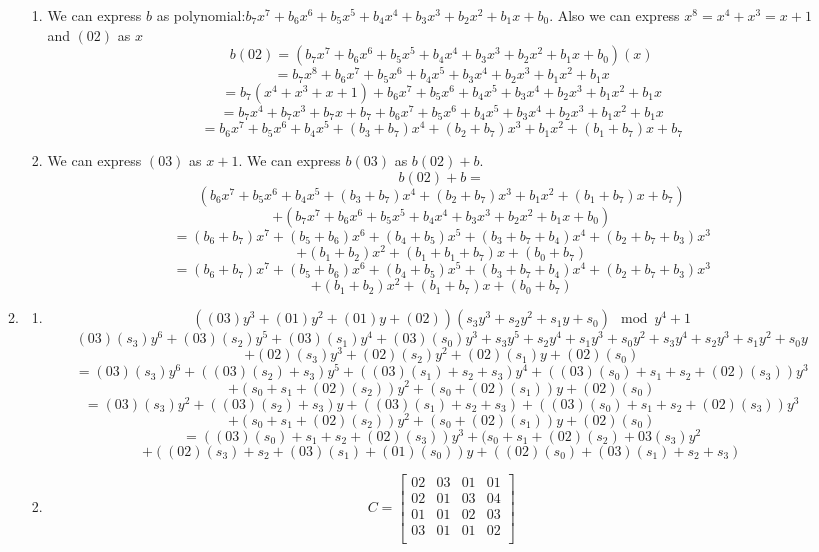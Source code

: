 \documentclass[11pt]{article}
\theoremstyle{definition}
\begin{document}
\begin{enumerate}
\begin{enumerate}
		\begin{enumerate}
			\item %
				We can express $b$ as polynomial:$b_7x^7+b_6x^6+b_5x^5+b_4x^4+b_3x^3+b_2x^2+b_1x+b_0$. Also we can express $x^8 = x^4+x^3=x+1$ and $(02)$ as $x$
				\[b(02) = (b_7x^7+b_6x^6+b_5x^5+b_4x^4+b_3x^3+b_2x^2+b_1x+b_0)(x)\]
				\[=b_7x^8+b_6x^7+b_5x^6+b_4x^5+b_3x^4+b_2x^3+b_1x^2+b_1x\]
				\[=b_7(x^4+x^3+x+1) + b_6x^7+b_5x^6+b_4x^5+b_3x^4+b_2x^3+b_1x^2+b_1x\]
				\[ = b_7x^4 +b_7x^3+b_7x+ b_7+ b_6x^7+b_5x^6+b_4x^5+b_3x^4+b_2x^3+b_1x^2+b_1x\]
				\[= b_6x^7+b_5x^6+b_4x^5+(b_3+b_7)x^4+(b_2+b_7)x^3+b_1x^2+(b_1+b_7)x + b_7\]
			\item %
				We can express $(03)$ as $x+1$. We can express $b(03)$ as $b(02) + b$.
				\[b(02) + b = \]
				\[(b_6x^7+b_5x^6+b_4x^5+(b_3+b_7)x^4+(b_2+b_7)x^3+b_1x^2+(b_1+b_7)x + b_7)\]  \[ + (b_7x^7+b_6x^6+b_5x^5+b_4x^4+b_3x^3+b_2x^2+b_1x+b_0)\]
				\[= (b_6+b_7)x^7+(b_5+b_6)x^6+(b_4+b_5)x^5+(b_3+b_7+b_4)x^4+(b_2+b_7+b_3)x^3\]
				\[+(b_1+b_2)x^2+(b_1+b_1+b_7)x+(b_0+b_7)\]
				\[= (b_6+b_7)x^7+(b_5+b_6)x^6+(b_4+b_5)x^5+(b_3+b_7+b_4)x^4+(b_2+b_7+b_3)x^3\]
				\[+(b_1+b_2)x^2+(b_1+b_7)x+(b_0+b_7)\]
		\end{enumerate}
		
		\item %
		
		\begin{enumerate}
			\item %
			\[((03)y^3+(01)y^2+(01)y+(02))(s_3y^3+s_2y^2+s_1y+s_0) \mod{y^4 + 1}\]
			\[(03)(s_3)y^6+(03)(s_2)y^5+(03)(s_1)y^4+(03)(s_0)y^3+s_3y^5+s_2y^4+s_1y^3+s_0y^2+s_3y^4+ s_2y^3+s_1y^2+s_0y\]
			\[+(02)(s_3)y^3+(02)(s_2)y^2+(02)(s_1)y+(02)(s_0)\]
			\[= (03)(s_3)y^6+((03)(s_2) + s_3)y^5 + ((03)(s_1)+s_2+s_3)y^4+((03)(s_0)+s_1+s_2+(02)(s_3))y^3\] 
			\[+ (s_0+s_1+(02)(s_2))y^2 + (s_0+(02)(s_1))y + (02)(s_0)\]
			\[= (03)(s_3)y^2+((03)(s_2) + s_3)y + ((03)(s_1)+s_2+s_3)+((03)(s_0)+s_1+s_2+(02)(s_3))y^3\] 
			\[+ (s_0+s_1+(02)(s_2))y^2 + (s_0+(02)(s_1))y + (02)(s_0)\]
			\[=((03)(s_0)+s_1+s_2+(02)(s_3))y^3+ (s_0+s_1+(02)(s_2)+03(s_3)y^2\]
			\[ + ((02)(s_3)+s_2+(03)(s_1)+(01)(s_0))y + ((02)(s_0)+(03)(s_1)+s_2+s_3)\]
			\item %
				\[C = 
				\begin{bmatrix}
					02 & 03 & 01 & 01 \\
					02 & 01 & 03 & 04\\
					01 &01 &02 &03 \\
					03 & 01 & 01 & 02\\
				\end{bmatrix}\]
		\end{enumerate}
	\end{enumerate}
	

\end{enumerate}
\end{document}
